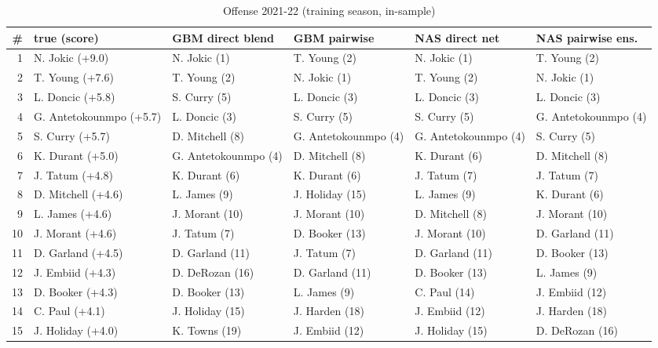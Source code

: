 \documentclass[10pt]{article}
\begin{document}
\clearpage
\begin{table}[ht]\centering\scriptsize
\caption{Offense 2021-22 (training season, in-sample)}
\begin{tabular}{rlllll}
\toprule
\# & true (score) & GBM direct blend & GBM pairwise & NAS direct net & NAS pairwise ens. \\
\midrule
1 & N. Jokic (+9.0) & N. Jokic (1) & T. Young (2) & N. Jokic (1) & T. Young (2) \\
2 & T. Young (+7.6) & T. Young (2) & N. Jokic (1) & T. Young (2) & N. Jokic (1) \\
3 & L. Doncic (+5.8) & S. Curry (5) & L. Doncic (3) & L. Doncic (3) & L. Doncic (3) \\
4 & G. Antetokounmpo (+5.7) & L. Doncic (3) & S. Curry (5) & S. Curry (5) & G. Antetokounmpo (4) \\
5 & S. Curry (+5.7) & D. Mitchell (8) & G. Antetokounmpo (4) & G. Antetokounmpo (4) & S. Curry (5) \\
6 & K. Durant (+5.0) & G. Antetokounmpo (4) & D. Mitchell (8) & K. Durant (6) & D. Mitchell (8) \\
7 & J. Tatum (+4.8) & K. Durant (6) & K. Durant (6) & J. Tatum (7) & J. Tatum (7) \\
8 & D. Mitchell (+4.6) & L. James (9) & J. Holiday (15) & L. James (9) & K. Durant (6) \\
9 & L. James (+4.6) & J. Morant (10) & J. Morant (10) & D. Mitchell (8) & J. Morant (10) \\
10 & J. Morant (+4.6) & J. Tatum (7) & D. Booker (13) & J. Morant (10) & D. Garland (11) \\
11 & D. Garland (+4.5) & D. Garland (11) & J. Tatum (7) & D. Garland (11) & D. Booker (13) \\
12 & J. Embiid (+4.3) & D. DeRozan (16) & D. Garland (11) & D. Booker (13) & L. James (9) \\
13 & D. Booker (+4.3) & D. Booker (13) & L. James (9) & C. Paul (14) & J. Embiid (12) \\
14 & C. Paul (+4.1) & J. Holiday (15) & J. Harden (18) & J. Embiid (12) & J. Harden (18) \\
15 & J. Holiday (+4.0) & K. Towns (19) & J. Embiid (12) & J. Holiday (15) & D. DeRozan (16) \\
\bottomrule
\end{tabular}
\end{table}
\end{document}
